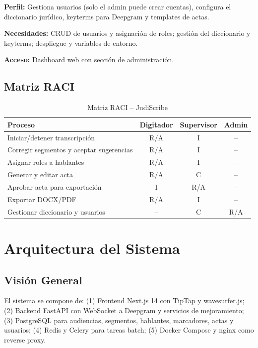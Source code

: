 \documentclass[12pt,a4paper]{report}
\begin{document}
\textbf{Perfil:} Gestiona usuarios (solo el admin puede crear cuentas), configura el diccionario jurídico, keyterms para Deepgram y templates de actas.

\textbf{Necesidades:} CRUD de usuarios y asignación de roles; gestión del diccionario y keyterms; despliegue y variables de entorno.

\textbf{Acceso:} Dashboard web con sección de administración.

\section{Matriz RACI}

\begin{table}[H]
\centering
\small
\begin{tabular}{|p{4.5cm}|c|c|c|}
\hline
\rowcolor{primaryblue!20}
\textbf{Proceso} & \textbf{Digitador} & \textbf{Supervisor} & \textbf{Admin} \\
\hline
Iniciar/detener transcripción & R/A & I & -- \\
\hline
Corregir segmentos y aceptar sugerencias & R/A & I & -- \\
\hline
Asignar roles a hablantes & R/A & I & -- \\
\hline
Generar y editar acta & R/A & C & -- \\
\hline
Aprobar acta para exportación & I & R/A & -- \\
\hline
Exportar DOCX/PDF & R/A & I & -- \\
\hline
Gestionar diccionario y usuarios & -- & C & R/A \\
\hline
\end{tabular}
\caption{Matriz RACI -- JudiScribe}
\end{table}

\chapter{Arquitectura del Sistema}

\section{Visión General}

El sistema se compone de: (1) Frontend Next.js 14 con TipTap y wavesurfer.js; (2) Backend FastAPI con WebSocket a Deepgram y servicios de mejoramiento; (3) PostgreSQL para audiencias, segmentos, hablantes, marcadores, actas y usuarios; (4) Redis y Celery para tareas batch; (5) Docker Compose y nginx como reverse proxy.
\end{document}
